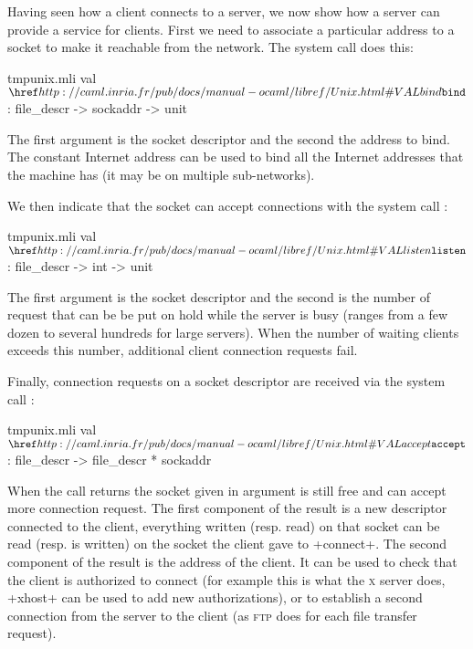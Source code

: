 Having seen how a client connects to a server, we now show how a
server can provide a service for clients. First we need to associate a
particular address to a socket to make it reachable from the network.
The system call  does this:
%
\begin{listingcodefile}{tmpunix.mli}
val $\libvalue{Unix}{bind}$ : file_descr -> sockaddr -> unit
\end{listingcodefile}
% 
The first argument is the socket descriptor and the second the address
to bind. The constant Internet address  can be
used to bind all the Internet addresses that the machine has (it may
be on multiple sub-networks).

We then indicate that the socket can accept connections with the
system call :
%
\begin{listingcodefile}{tmpunix.mli}
val $\libvalue{Unix}{listen}$ : file_descr -> int -> unit
\end{listingcodefile}
% 
The first argument is the socket descriptor and the second is the
number of request that can be be put on hold while the server is busy
(ranges from a few dozen to several hundreds for large servers). When
the number of waiting clients exceeds this number, additional client 
connection requests fail.

Finally, connection requests on a socket descriptor are received via the 
system call :
%
\begin{listingcodefile}{tmpunix.mli}
val $\libvalue{Unix}{accept}$ : file_descr -> file_descr * sockaddr
\end{listingcodefile}
% 
When the call returns the socket given in argument is still free and
can accept more connection request. The first component of the result
is a new descriptor connected to the client, everything written
(resp. read) on that socket can be read (resp. is written) on the
socket the client gave to \ml+connect+. The second component of the
result is the address of the client. It can be used to check that the
client is authorized to connect (for example this is what the
\textsc{x} server does, \ml+xhost+ can be used to add new
authorizations), or to establish a second connection from the server
to the client (as \textsc{ftp} does for each file transfer request).

